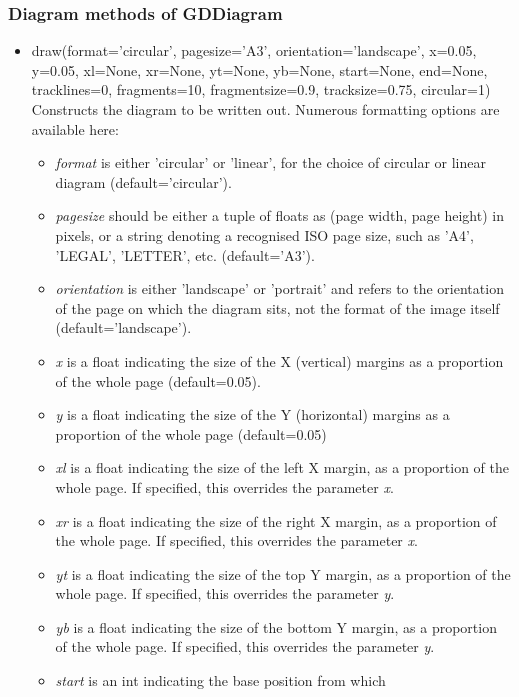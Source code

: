 \documentclass{article}
\begin{document}
\subsubsection{Diagram methods of GDDiagram}
\begin{itemize}
\item {draw(format='circular', pagesize='A3', orientation='landscape',
x=0.05, y=0.05, xl=None, xr=None, yt=None, yb=None, start=None, end=None, 
tracklines=0, fragments=10, fragment\us size=0.9, track\us size=0.75, 
circular=1)}
Constructs the diagram to be written out.  Numerous formatting options are 
available here: 
\begin{itemize}
	\item \textit{format} is either 'circular' or 'linear', for the 
	choice of circular or linear diagram (default='circular').
	\item \textit{pagesize} should be either a tuple of floats as 
	(page width, page height) in pixels, or a string denoting 
	a recognised ISO page size, such as 'A4', 'LEGAL', 'LETTER', etc.
	(default='A3').
	\item \textit{orientation} is either 'landscape' or 'portrait' and 
	refers to the orientation of the page on which the diagram sits, not 
	the format of the image itself (default='landscape').
	\item \textit{x} is a float indicating the size of the X (vertical)
	margins as a proportion of the whole page (default=0.05).
	\item \textit{y} is a float indicating the size of the Y (horizontal) 
	margins as a proportion of the whole page (default=0.05)
	\item \textit{xl} is a float indicating the size of the left X margin,
	as a proportion of the whole page.  If specified, this overrides the 
	parameter \textit{x}.
	\item \textit{xr} is a float indicating the size of the right X margin,
	as a proportion of the whole page.  If specified, this overrides the 
	parameter \textit{x}.
	\item \textit{yt} is a float indicating the size of the top Y margin,
	as a proportion of the whole page.  If specified, this overrides the 
	parameter \textit{y}.
	\item \textit{yb} is a float indicating the size of the bottom Y margin,
	as a proportion of the whole page.  If specified, this overrides the 
	parameter \textit{y}.
	\item \textit{start} is an int indicating the base position from which 

\end{itemize}
\end{itemize}
\end{document}
